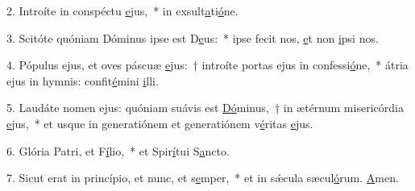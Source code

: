 2. Introíte in conspéctu \uline{e}jus,~* in exsult\uline{a}ti\uline{ó}ne.\par 
3. Scitóte quóniam Dóminus ipse est D\uline{e}us:~* ipse fecit nos, \uline{e}t non \uline{i}psi nos.\par 
4. Pópulus ejus, et oves páscuæ \uline{e}jus:~† introíte portas ejus in confessi\uline{ó}ne,~* átria ejus in hymnis: confit\uline{é}mini \uline{i}lli.\par 
5. Laudáte nomen ejus: quóniam suávis est \uline{Dó}minus,~† in ætérnum misericórdia \uline{e}jus,~* et usque in generatiónem et generatiónem v\uline{é}ritas \uline{e}jus.\par 
6. Glória Patri, et F\uline{í}lio,~* et Spir\uline{í}tui S\uline{a}ncto.\par 
7. Sicut erat in princípio, et nunc, et s\uline{e}mper,~* et in sǽcula sæcul\uline{ó}rum. \uline{A}men.\par 
